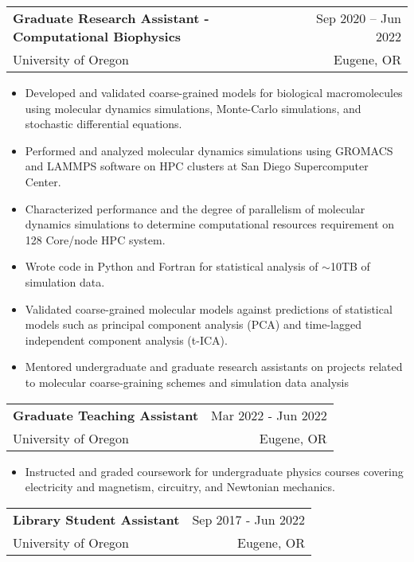 \documentclass[letterpaper,10.8pt]{article}
\makeatletter
\newcommand{\resumeSubheading}[4]{
  \vspace{-1pt} \item
    \begin{tabular*}{0.97\textwidth}{l@{\extracolsep{\fill}}r}
      \textbf{#1} & #2 \\
      #3  &  #4 \\
    \end{tabular*}\vspace{-5pt}
}
\makeatother
\begin{document}
    \resumeSubheading
		{Graduate Research Assistant - Computational Biophysics}{Sep 2020 – Jun 2022}
		{University of Oregon}{Eugene, OR}
	\begin{itemize}[label={$\diamond$}]
	\itemsep0em  %
	
	\item{Developed and validated coarse-grained models for biological macromolecules using molecular dynamics simulations, Monte-Carlo simulations, and stochastic differential equations.}
	
	\item{Performed and analyzed molecular dynamics simulations using GROMACS and LAMMPS software on HPC clusters at San Diego Supercomputer Center.}
	
	\item{Characterized performance and the degree of parallelism of molecular dynamics simulations to determine computational resources requirement on 128 Core/node HPC system.}

	\item{Wrote code in Python and Fortran for statistical analysis of $\sim$10TB of simulation data.}
	
	\item{Validated coarse-grained molecular models against predictions of statistical models such as principal component analysis (PCA) and time-lagged independent component analysis (t-ICA).}
	
	\item{Mentored undergraduate and graduate research assistants on projects related
to molecular coarse-graining schemes and simulation data analysis}
	
	\end{itemize} %

    \resumeSubheading
    {Graduate Teaching Assistant}{Mar 2022 - Jun 2022}
    {University of Oregon}{Eugene, OR}
    
    \begin{itemize}[label={$\diamond$}]
    \itemsep0em  %
	\item {Instructed and graded coursework for undergraduate physics courses covering electricity and magnetism, circuitry, and Newtonian mechanics.}

	\end{itemize} %
	
	\resumeSubheading
    {Library Student Assistant}{Sep 2017 - Jun 2022}
    {University of Oregon}{Eugene, OR}
    
\end{document}
